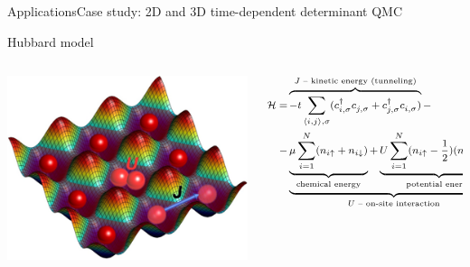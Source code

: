 \documentclass[xcolor=table,final]{beamer} %
\begin{document}
\begin{frame}{Applications}{Case study: %
    2D and 3D time-dependent determinant QMC}
  \begin{block}{Hubbard model}
    \begin{columns}
      \begin{column}{0.35\textwidth}
        \includegraphics[width=1.\textwidth]{figs/extras/hubbard_model}
      \end{column}
      \begin{column}{0.7\textwidth}
        \begin{equation*}
          \footnotesize
          \begin{split}
            {\cal H} =& 
            \overbrace{
              -t \sum_{\langle i,j \rangle,\sigma} 
              (c^{\dagger}_{i,\sigma} c^{}_{j,\sigma}+ c^{\dagger}_{j,\sigma}c^{}_{i,\sigma})%
            }^{\text{$J$ -- kinetic energy (tunneling)}} - 
            \\ -&
            \underbrace{
              \underbrace{
                \mu \sum_{i=1}^{N} (n_{i\uparrow} + n_{i\downarrow})%
              }_{\text{chemical energy}} +
              \underbrace{
                U \sum_{i=1}^{N} (n_{i\uparrow} -\frac{1}{2}) (n_{i\downarrow}-\frac{1}{2})%
              }_{\text{potential energy}}
            }_{\text{$U$ -- on-site interaction}},

\end{split}
\end{equation*}
\end{column}
\end{columns}
\end{block}
\end{frame}
\end{document}
